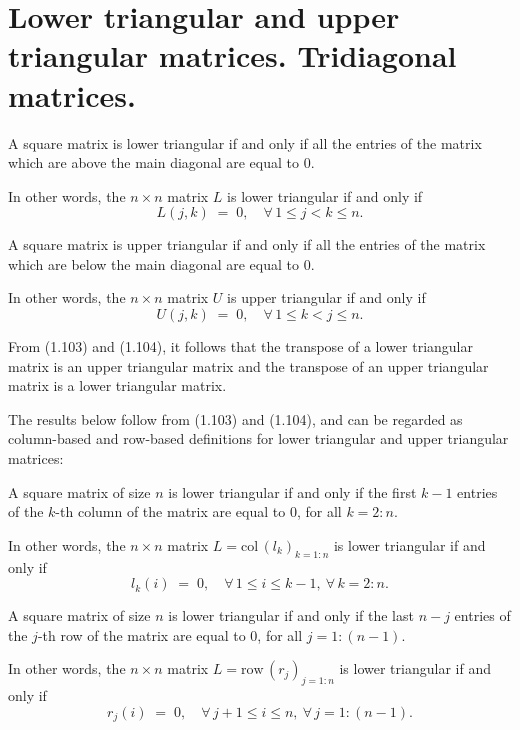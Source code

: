 
\section{Lower triangular and upper triangular matrices. Tridiagonal matrices.}

\begin{definition}
A square matrix is lower triangular if and only if all the entries of the
matrix which are above the main diagonal are equal to $0$.

In other words, the $n\times n$ matrix $L$ is lower triangular if and
only if
\begin{equation}
L(j,k) \;=\; 0, \quad \forall\, 1\le j<k\le n.
\end{equation}
\end{definition}

\begin{definition}
A square matrix is upper triangular if and only if all the entries of the
matrix which are below the main diagonal are equal to $0$.

In other words, the $n\times n$ matrix $U$ is upper triangular if and
only if
\begin{equation}
U(j,k) \;=\; 0, \quad \forall\, 1\le k<j\le n.
\end{equation}
\end{definition}

From (1.103) and (1.104), it follows that the transpose of a lower
triangular matrix is an upper triangular matrix and the transpose of an
upper triangular matrix is a lower triangular matrix.

The results below follow from (1.103) and (1.104), and can be regarded as
column-based and row-based definitions for lower triangular and upper
triangular matrices:

\begin{lemma}
A square matrix of size $n$ is lower triangular if and only if the first
$k-1$ entries of the $k$-th column of the matrix are equal to $0$, for
all $k=2:n$.

In other words, the $n\times n$ matrix $L=\mathrm{col}\,(l_k)_{k=1:n}$ is
lower triangular if and only if
\begin{equation}
l_k(i) \;=\; 0, \quad \forall\, 1\le i\le k-1,\ \forall\, k=2:n.
\end{equation}

A square matrix of size $n$ is lower triangular if and only if the last
$n-j$ entries of the $j$-th row of the matrix are equal to $0$, for all
$j=1:(n-1)$.

In other words, the $n\times n$ matrix $L=\mathrm{row}\,(r_j)_{j=1:n}$ is
lower triangular if and only if
\begin{equation}
r_j(i) \;=\; 0, \quad \forall\, j+1\le i\le n,\ \forall\, j=1:(n-1).
\end{equation}
\end{lemma}

